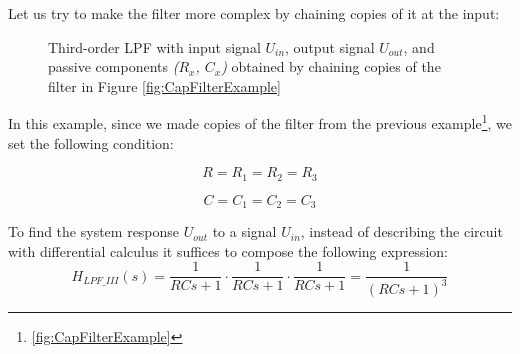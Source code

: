 \documentclass[a4paper, 10pt, final]{article} %
\begin{document}
    \noindent Let us try to make the filter more complex by chaining copies of it at the input:
    \begin{figure}[H]
        \centering
        \caption{Third-order LPF with input signal $U_{in}$, output signal $U_{out}$, and passive components \emph{($R_x$, $C_x$)} obtained by chaining copies of the filter in Figure \ref{fig:CapFilterExample}}
        \label{fig:CapFilterExample2}
    \end{figure}
    \noindent In this example, since we made copies of the filter from the previous example\footnote{\ref{fig:CapFilterExample}}, we set the following condition:
    \begin{figure}[H]
        \centering
        \begin{minipage}[b]{.31\linewidth}
            \centering
            \begin{equation*}
                R = R_1 = R_2 = R_3
            \end{equation*}
        \end{minipage}
        \hspace{0.04\linewidth}
        \begin{minipage}[b]{.31\linewidth}
            \centering
            \begin{equation*}
                C = C_1 = C_2 = C_3
            \end{equation*}
        \end{minipage}
    \end{figure}
    \noindent To find the system response $U_{out}$ to a signal $U_{in}$, instead of describing the circuit with differential calculus it suffices to compose the following expression:
    \begin{equation*}
        H_{LPF\_III}(s) = \frac{1}{RCs+1} \cdot \frac{1}{RCs+1} \cdot \frac{1}{RCs+1} = \frac{1}{\left(RCs+1\right)^3}
    \end{equation*}
\end{document}
